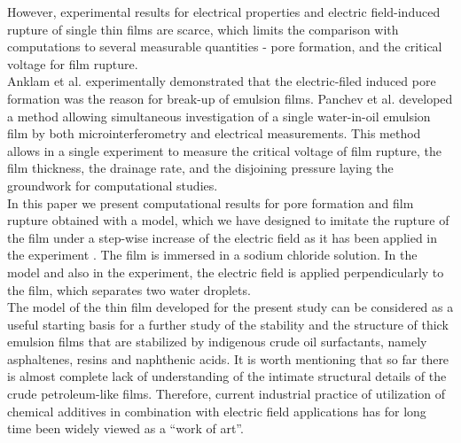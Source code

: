 However, experimental results for electrical properties and electric field-induced rupture of single thin films are scarce, which limits the comparison with computations to several measurable quantities - pore formation, and the critical voltage for film rupture.\\ Anklam et al.  \cite{Anklam1999} experimentally demonstrated that the electric-filed induced pore formation was the reason for break-up of emulsion films. Panchev et al. \cite{Panchev200874} 
developed a method allowing simultaneous investigation of a single water-in-oil emulsion film by both microinterferometry and electrical measurements. This method allows in a single experiment to measure the critical voltage of film rupture, the film thickness, the drainage rate, and the disjoining pressure laying the groundwork for computational studies. \\
 
In this paper we present computational results for pore formation and film rupture obtained with a model, which we have designed to imitate the rupture of the film under a step-wise increase of the electric field as it has been applied  in the experiment \cite{Panchev200874}. The film is immersed in a sodium chloride solution. In the model and also in the experiment, the electric field is applied perpendicularly to the film, which separates two water droplets.\\

The model of the thin film developed for the present study can be considered as a useful starting basis  for a further study of the stability and the structure of thick emulsion films that are stabilized by indigenous crude oil surfactants, namely asphaltenes, resins and naphthenic acids. It is worth mentioning that so far there is almost complete lack of understanding of the intimate structural details of the crude petroleum-like films. Therefore, current industrial practice of utilization of chemical additives in combination with electric field applications has for long time been widely viewed as a ``work of art''. 
